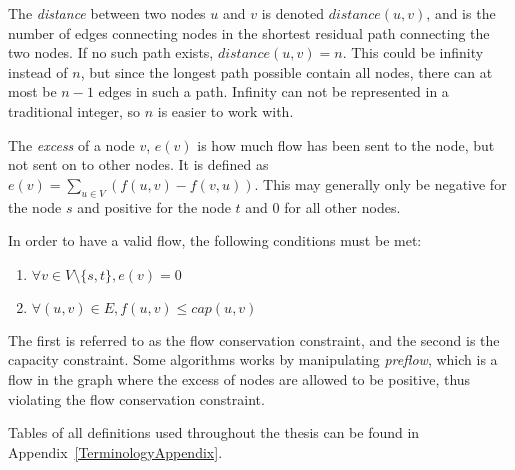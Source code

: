 The \emph{distance} between two nodes $u$ and $v$ is denoted $distance(u, v)$, and is the number of edges connecting nodes in the shortest residual path connecting the two nodes.
If no such path exists, $distance(u, v)=n$. 
This could be infinity instead of $n$, but since the longest path possible contain all nodes, there can at most be $n-1$ edges in such a path.
Infinity can not be represented in a traditional integer, so $n$ is easier to work with.


The \emph{excess} of a node $v$, $e(v)$ is how much flow has been sent to the node, but not sent on to other nodes. It is defined as $e(v)=\sum_{u \in V}\left(f(u, v) - f(v, u)\right)$. 
This may generally only be negative for the node $s$ and positive for the node $t$ and 0 for all other nodes.


In order to have a valid flow, the following conditions must be met:
\begin{enumerate}
  \item  $\forall v \in V \setminus \{s, t\}, e(v) = 0$ 
  \item $\forall (u, v) \in E , f(u, v) \leq cap(u, v)$
\end{enumerate}
The first is referred to as the flow conservation constraint, and the second is the capacity constraint.
Some algorithms works by manipulating \emph{preflow}, which is a flow in the graph where the excess of nodes are allowed to be positive, thus violating the flow conservation constraint.

Tables of all definitions used throughout the thesis can be found in Appendix~\ref{TerminologyAppendix}.